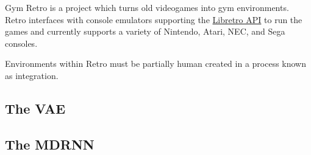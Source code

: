 \documentclass{article}
\numberwithin{figure}{section}
\theoremstyle{definition}
\begin{document}
Gym Retro is a project which turns old videogames into gym environments. %
Retro interfaces with console emulators supporting the \href{https://www.libretro.com/index.php/api/}{Libretro API} to run the games and currently supports a variety of Nintendo, Atari, NEC, and Sega consoles.

Environments within Retro must be partially human created in a process known as integration.


\subsection{The VAE}

\subsection{The MDRNN}







% 
\end{document}
